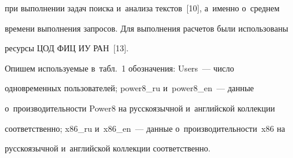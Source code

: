 при выполнении задач поиска и~анализа текс\-тов~[10], а~именно о~сред\-нем 

времени выполнения запросов. Для выполнения расчетов были использованы 

ресурсы ЦОД ФИЦ ИУ РАН~[13].

  

  Опишем используемые в~табл.~1 обозначения: Users~--- чис\-ло 

одновременных пользователей; power8\_ru и~power8\_en~--- данные 

о~производительности Power8 на русскоязычной и~английской коллекции 

соответственно; x86\_ru и~x86\_en~--- данные о~про\-из\-во\-ди\-тель\-ности~x86 на 

русскоязычной и~английской коллекции соответственно.

  

